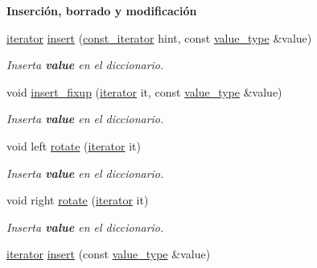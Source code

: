 \begin{Indent}\textbf{ Inserción, borrado y modificación}\par
\begin{DoxyCompactItemize}
\item 
\hyperlink{classaed2_1_1iterator_1_1iterator}{iterator} \hyperlink{classaed2_1_1iterator_ab9446668ad5619115b6c4a10eac83d68_ab9446668ad5619115b6c4a10eac83d68}{insert} (\hyperlink{classaed2_1_1iterator_1_1const__iterator}{const\+\_\+iterator} hint, const \hyperlink{classaed2_1_1iterator_a6411a2c08b2b7c52f063bef1a168acb6_a6411a2c08b2b7c52f063bef1a168acb6}{value\+\_\+type} \&value)
\begin{DoxyCompactList}\small\item\em Inserta {\bfseries value} en el diccionario. \end{DoxyCompactList}\item 
void \hyperlink{classaed2_1_1iterator_ab23378eb6149357e1a2167e9804eb6e3_ab23378eb6149357e1a2167e9804eb6e3}{insert\+\_\+fixup} (\hyperlink{classaed2_1_1iterator_1_1iterator}{iterator} it, const \hyperlink{classaed2_1_1iterator_a6411a2c08b2b7c52f063bef1a168acb6_a6411a2c08b2b7c52f063bef1a168acb6}{value\+\_\+type} \&value)
\begin{DoxyCompactList}\small\item\em Inserta {\bfseries value} en el diccionario. \end{DoxyCompactList}\item 
void left \hyperlink{classaed2_1_1iterator_af4e447a081108196ecdf39b16ecb5303_af4e447a081108196ecdf39b16ecb5303}{rotate} (\hyperlink{classaed2_1_1iterator_1_1iterator}{iterator} it)
\begin{DoxyCompactList}\small\item\em Inserta {\bfseries value} en el diccionario. \end{DoxyCompactList}\item 
void right \hyperlink{classaed2_1_1iterator_a191eae4f3f076914ff1560a2fa833b70_a191eae4f3f076914ff1560a2fa833b70}{rotate} (\hyperlink{classaed2_1_1iterator_1_1iterator}{iterator} it)
\begin{DoxyCompactList}\small\item\em Inserta {\bfseries value} en el diccionario. \end{DoxyCompactList}\item 
\hyperlink{classaed2_1_1iterator_1_1iterator}{iterator} \hyperlink{classaed2_1_1iterator_aa1870e8bfa4f45c82fa1ee076846922b_aa1870e8bfa4f45c82fa1ee076846922b}{insert} (const \hyperlink{classaed2_1_1iterator_a6411a2c08b2b7c52f063bef1a168acb6_a6411a2c08b2b7c52f063bef1a168acb6}{value\+\_\+type} \&value)
\end{DoxyCompactItemize}
\end{Indent}
